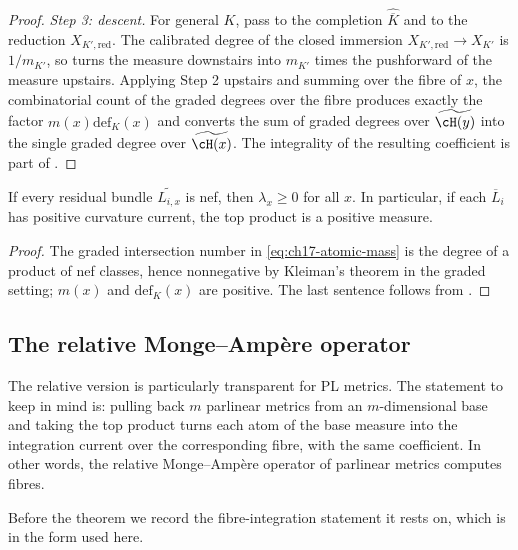 \begin{proof}
\emph{Step 3: descent.}  For general $K$, pass to the completion
$\widehat{\overline K}$ and to the reduction $X_{K'\!,\mathrm{red}}$.
The calibrated degree of the closed immersion
$X_{K'\!,\mathrm{red}}\to X_{K'}$ is $1/m_{K'}$, so
 turns the measure downstairs into
$m_{K'}$ times the pushforward of the measure upstairs.  Applying Step 2
upstairs and summing over the fibre of $x$, the combinatorial count of the
graded degrees over the fibre produces exactly the factor
$m(x)\mathrm{def}_K(x)$ and converts the sum of graded degrees over
$\widetilde{\cH(y)}$ into the single graded degree over
$\widetilde{\cH(x)}$.  The integrality of the resulting coefficient is part of
\cite[Theorem~18.4.7]{CLD25}.
\end{proof}

\begin{corollary}
\label{cor:ch17-atoms-nonneg}
If every residual bundle $\widetilde{L_{i,x}}$ is nef, then
$\lambda_x\ge0$ for all $x$.  In particular, if each
$\overline L_i$ has positive curvature current, the top product is a
positive measure.
\end{corollary}

\begin{proof}
The graded intersection number in \eqref{eq:ch17-atomic-mass} is the degree
of a product of nef classes, hence nonnegative by Kleiman's theorem in the
graded setting; $m(x)$ and $\mathrm{def}_K(x)$ are positive.  The last
sentence follows from .
\end{proof}

\subsection{The relative Monge--Amp\`ere operator}
\label{sec:ch17-relative-ma}

The relative version is particularly transparent for PL metrics.  The
statement to keep in mind is: pulling back $m$ parlinear metrics from an
$m$-dimensional base and taking the top product turns each atom of the
base measure into the integration current over the corresponding fibre, with
the same coefficient.  In other words, the relative Monge--Amp\`ere operator
of parlinear metrics computes fibres.

Before the theorem we record the fibre-integration statement it rests on,
which is  in the form used here.

